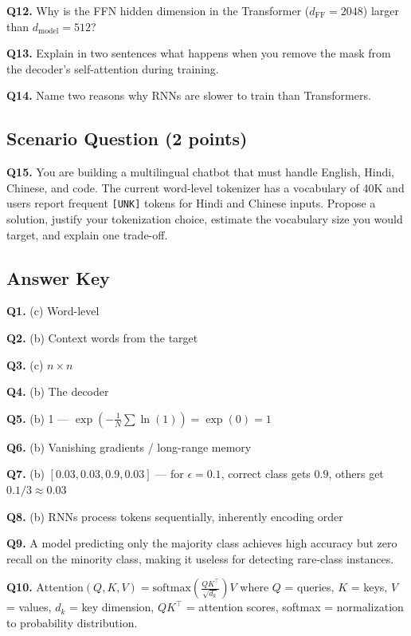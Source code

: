 \documentclass[11pt, a4paper]{article}
\begin{document}
\textbf{Q12.} Why is the FFN hidden dimension in the Transformer ($d_{\text{FF}} = 2048$) larger than $d_{\text{model}} = 512$?

\textbf{Q13.} Explain in two sentences what happens when you remove the mask from the decoder's self-attention during training.

\textbf{Q14.} Name two reasons why RNNs are slower to train than Transformers.

\subsection*{Scenario Question (2 points)}

\textbf{Q15.} You are building a multilingual chatbot that must handle English, Hindi, Chinese, and code. The current word-level tokenizer has a vocabulary of 40K and users report frequent \texttt{[UNK]} tokens for Hindi and Chinese inputs. Propose a solution, justify your tokenization choice, estimate the vocabulary size you would target, and explain one trade-off.

\newpage
\subsection*{Answer Key}

\textbf{Q1.} (c) Word-level

\textbf{Q2.} (b) Context words from the target

\textbf{Q3.} (c) $n \times n$

\textbf{Q4.} (b) The decoder

\textbf{Q5.} (b) 1 --- $\exp(-\frac{1}{N}\sum \ln(1)) = \exp(0) = 1$

\textbf{Q6.} (b) Vanishing gradients / long-range memory

\textbf{Q7.} (b) $[0.03, 0.03, 0.9, 0.03]$ --- for $\epsilon = 0.1$, correct class gets $0.9$, others get $0.1/3 \approx 0.03$

\textbf{Q8.} (b) RNNs process tokens sequentially, inherently encoding order

\textbf{Q9.} A model predicting only the majority class achieves high accuracy but zero recall on the minority class, making it useless for detecting rare-class instances.

\textbf{Q10.} $\text{Attention}(Q,K,V) = \text{softmax}\!\left(\frac{QK^\top}{\sqrt{d_k}}\right)V$ where $Q$ = queries, $K$ = keys, $V$ = values, $d_k$ = key dimension, $QK^\top$ = attention scores, softmax = normalization to probability distribution.
\end{document}

